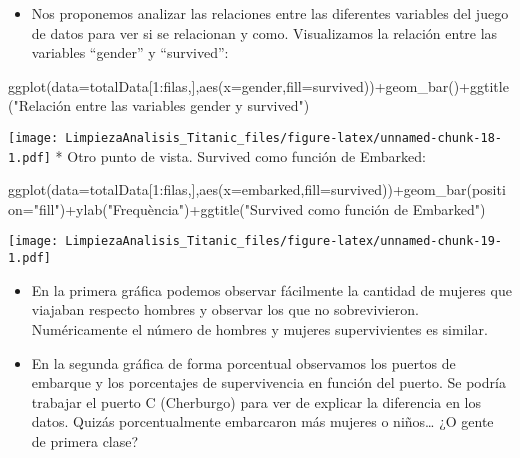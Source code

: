 \documentclass[
]{article}
\newenvironment{Shaded}{\begin{snugshade}}{\end{snugshade}}
\newcommand{\AttributeTok}[1]{\textcolor[rgb]{0.80,0.80,0.80}{#1}}
\newcommand{\DecValTok}[1]{\textcolor[rgb]{0.86,0.86,0.80}{#1}}
\newcommand{\FunctionTok}[1]{\textcolor[rgb]{0.94,0.94,0.56}{#1}}
\newcommand{\NormalTok}[1]{\textcolor[rgb]{0.80,0.80,0.80}{#1}}
\newcommand{\SpecialCharTok}[1]{\textcolor[rgb]{0.86,0.64,0.64}{#1}}
\newcommand{\StringTok}[1]{\textcolor[rgb]{0.80,0.58,0.58}{#1}}
\providecommand{\tightlist}{%
  \setlength{\itemsep}{0pt}\setlength{\parskip}{0pt}}
\begin{document}
\begin{itemize}
\tightlist
\item
  Nos proponemos analizar las relaciones entre las diferentes variables
  del juego de datos para ver si se relacionan y como. Visualizamos la
  relación entre las variables ``gender'' y ``survived'':
\end{itemize}

\begin{Shaded}
\begin{Highlighting}[]
\FunctionTok{ggplot}\NormalTok{(}\AttributeTok{data=}\NormalTok{totalData[}\DecValTok{1}\SpecialCharTok{:}\NormalTok{filas,],}\FunctionTok{aes}\NormalTok{(}\AttributeTok{x=}\NormalTok{gender,}\AttributeTok{fill=}\NormalTok{survived))}\SpecialCharTok{+}\FunctionTok{geom\_bar}\NormalTok{()}\SpecialCharTok{+}\FunctionTok{ggtitle}\NormalTok{(}\StringTok{"Relación entre las variables gender y survived"}\NormalTok{)}
\end{Highlighting}
\end{Shaded}

\texttt{[image: LimpiezaAnalisis\_Titanic\_files/figure-latex/unnamed-chunk-18-1.pdf]}
* Otro punto de vista. Survived como función de Embarked:

\begin{Shaded}
\begin{Highlighting}[]
\FunctionTok{ggplot}\NormalTok{(}\AttributeTok{data=}\NormalTok{totalData[}\DecValTok{1}\SpecialCharTok{:}\NormalTok{filas,],}\FunctionTok{aes}\NormalTok{(}\AttributeTok{x=}\NormalTok{embarked,}\AttributeTok{fill=}\NormalTok{survived))}\SpecialCharTok{+}\FunctionTok{geom\_bar}\NormalTok{(}\AttributeTok{position=}\StringTok{"fill"}\NormalTok{)}\SpecialCharTok{+}\FunctionTok{ylab}\NormalTok{(}\StringTok{"Frequència"}\NormalTok{)}\SpecialCharTok{+}\FunctionTok{ggtitle}\NormalTok{(}\StringTok{"Survived como función de Embarked"}\NormalTok{)}
\end{Highlighting}
\end{Shaded}

\texttt{[image: LimpiezaAnalisis\_Titanic\_files/figure-latex/unnamed-chunk-19-1.pdf]}

\begin{itemize}
\item
  En la primera gráfica podemos observar fácilmente la cantidad de
  mujeres que viajaban respecto hombres y observar los que no
  sobrevivieron. Numéricamente el número de hombres y mujeres
  supervivientes es similar.
\item
  En la segunda gráfica de forma porcentual observamos los puertos de
  embarque y los porcentajes de supervivencia en función del puerto. Se
  podría trabajar el puerto C (Cherburgo) para ver de explicar la
  diferencia en los datos. Quizás porcentualmente embarcaron más mujeres
  o niños\ldots{} ¿O gente de primera clase?
\end{itemize}
\end{document}
